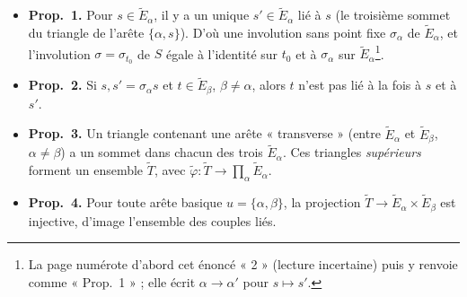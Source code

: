 \documentclass[11pt,a4paper]{article}
\begin{document}
\begin{itemize}
\item \textbf{Prop.~1.} Pour $s \in \widetilde E_\alpha$, il y a un unique $s' \in
  \widetilde E_\alpha$ lié à $s$ (le troisième sommet du triangle de l'arête
  $\lbrace \alpha, s\rbrace$). D'où une involution sans point fixe $\sigma_\alpha$
  de $\widetilde E_\alpha$, et l'involution $\sigma = \sigma_{t_0}$ de $S$ égale à
  l'identité sur $t_0$ et à $\sigma_\alpha$ sur $\widetilde E_\alpha$\footnote{La
  page numérote d'abord cet énoncé « 2 » (lecture incertaine) puis y renvoie
  comme « Prop.~1 » ; elle écrit $\alpha \to \alpha'$ pour $s \mapsto s'$.}.
\item \textbf{Prop.~2.} Si $s, s' = \sigma_\alpha s$ et $t \in \widetilde
  E_\beta$, $\beta \neq \alpha$, alors $t$ n'est pas lié à la fois à $s$ et à
  $s'$.
\item \textbf{Prop.~3.} Un triangle contenant une arête « transverse » (entre
  $\widetilde E_\alpha$ et $\widetilde E_\beta$, $\alpha \neq \beta$) a un sommet
  dans chacun des trois $\widetilde E_\alpha$. Ces triangles \emph{supérieurs}
  forment un ensemble $\widetilde T$, avec $\tilde\varphi : \widetilde T \to
  \prod_\alpha \widetilde E_\alpha$.
\item \textbf{Prop.~4.} Pour toute arête basique $u = \lbrace \alpha,
  \beta\rbrace$, la projection $\widetilde T \to \widetilde E_\alpha \times
  \widetilde E_\beta$ est injective, d'image l'ensemble des couples liés.
\end{itemize}
\end{document}
